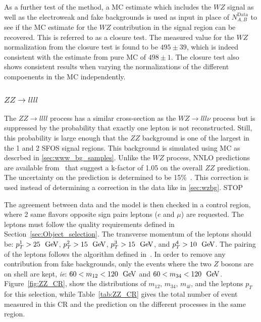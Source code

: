 As a further test of the method, a MC estimate which includes the $WZ$ signal as
well as the electroweak and fake backgrounds is used as input in place 
of $N^{\textrm{Data}}_{A,B}$ to see if the MC estimate for the $WZ$
contribution in the signal region can be recovered. This is referred to as
a closure test.  The measured value for the $WZ$ normalization from the 
closure test is found to be  $495\pm39$, which is indeed consistent with the
estimate from pure MC of $498\pm1$. The closure test also shows consistent
results when varying the normalizations of the different compoenents 
in the MC independently.




\subsubsection{$ZZ\rightarrow llll$}
\label{sec:zzbg}

The $ZZ\rightarrow llll$ process has a similar cross-section as 
the $WZ\rightarrow lll\nu$ process but is 
suppressed by the probability that exactly one lepton is not reconstructed. 
Still, this probability is large enough that the $ZZ$ background is one of the 
largest in the 1 and 2 SFOS signal regions.  This background is simulated
using MC as descrbed in \sec\ref{sec:www_bg_samples}.
Unlike the $WZ$ process, NNLO predictions are available 
from~\cite{Cascioli:2014yka,Baglio:2013toa,Bierweiler:2013dja}
that suggest a k-factor of 1.05 on the overall $ZZ$ prediction.
The uncertainty on the prediction is determined to be 
15\%~\cite{Cascioli:2014yka,Baglio:2013toa,Bierweiler:2013dja}.
This correction is used instead of determining a correction in the data
like in \sec\ref{sec:wzbg}.
STOP


The agreement between data and the model is then checked in a control region, where 2 same flavors opposite sign pairs leptons ($e$ and $\mu$) are requested. The leptons must follow the quality requirements defined in Section~\ref{sec:Object_selection}. The transverse momentum of the leptons should be: $p_{T}^{1}>25~\GeV$, $p_{T}^{2}>15~\GeV$, $p_{T}^{3}>15~\GeV$, and  $p_{T}^{4}>10~\GeV$. The pairing of the leptons follows the algorithm defined in~\cite{Aad:2014wra}. In order to remove any contribution from fake backgrounds, only the events where the two $Z$ bosons are on shell are kept, \textit{ie}: $60<m_{12}<120~\GeV$ and $60<m_{34}<120~\GeV$. Figure~\ref{fig:ZZ_CR}, show the distributions of $m_{12}$, $m_{34}$, $m_{4l}$, and the leptons $p_{T}$ for this selection, while Table~\ref{tab:ZZ_CR} gives the total number of event measured in this CR and the prediction on the different processes in the same region.

